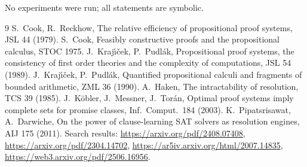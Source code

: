 \documentclass[11pt]{article}
\theoremstyle{definition}
\theoremstyle{remark}
\begin{document}
\noindent No experiments were run; all statements are symbolic.

\begin{thebibliography}{9}
 S.~Cook, R.~Reckhow, The relative efficiency of propositional proof systems, JSL 44 (1979).
 S.~Cook, Feasibly constructive proofs and the propositional calculus, STOC 1975.
 J.~Kraj\'{\i}\v{c}ek, P.~Pudl\'ak, Propositional proof systems, the consistency of first order theories and the complexity of computations, JSL 54 (1989).
 J.~Kraj\'{\i}\v{c}ek, P.~Pudl\'ak, Quantified propositional calculi and fragments of bounded arithmetic, ZML 36 (1990).
 A.~Haken, The intractability of resolution, TCS 39 (1985).
 J.~K\"obler, J.~Messner, J.~Tor\'an, Optimal proof systems imply complete sets for promise classes, Inf.\ Comput.\ 184 (2003).
 K.~Pipatsrisawat, A.~Darwiche, On the power of clause-learning SAT solvers as resolution engines, AIJ 175 (2011).
 Search results: \url{https://arxiv.org/pdf/2408.07408}, \url{https://arxiv.org/pdf/2304.14702}, \url{https://ar5iv.arxiv.org/html/2007.14835}, \url{https://web3.arxiv.org/pdf/2506.16956}.
\end{thebibliography}
\end{document}
